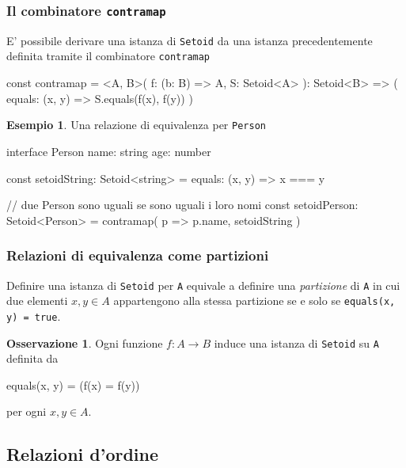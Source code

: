 \documentclass[12pt]{article}
\theoremstyle{definition}
\newtheorem{example}{Esempio}[section]
\newtheorem{observation}{Osservazione}[section]
\newenvironment{code}
  {\vspace{0.5cm} \VerbatimEnvironment\begin{typescriptcode}}
  {\end{typescriptcode} \vspace{0.2cm}}
\begin{document}
\subsubsection{Il combinatore \texttt{contramap}}

E' possibile derivare una istanza di \texttt{Setoid} da una istanza precedentemente definita tramite il combinatore \texttt{contramap}

\begin{code}
const contramap = <A, B>(
  f: (b: B) => A,
  S: Setoid<A>
): Setoid<B> => ({
  equals: (x, y) => S.equals(f(x), f(y))
})
\end{code}

\begin{example}
Una relazione di equivalenza per \texttt{Person}

\begin{code}
interface Person {
  name: string
  age: number
}

const setoidString: Setoid<string> = {
  equals: (x, y) => x === y
}

// due Person sono uguali se sono uguali i loro nomi
const setoidPerson: Setoid<Person> = contramap(
  p => p.name,
  setoidString
)
\end{code}
\end{example}

\subsubsection{Relazioni di equivalenza come partizioni}

Definire una istanza di \texttt{Setoid} per \texttt{A} equivale a definire una \emph{partizione} di \texttt{A} in cui due
elementi $x, y \in A$ appartengono alla stessa partizione se e solo se \texttt{equals(x, y) = true}.

\begin{observation}
Ogni funzione $f: A \rightarrow B$ induce una istanza di \texttt{Setoid} su \texttt{A} definita da

\begin{code}
equals(x, y) = (f(x) = f(y))
\end{code}
\end{observation}

per ogni $x, y \in A$.

\subsection{Relazioni d'ordine}
\end{document}
